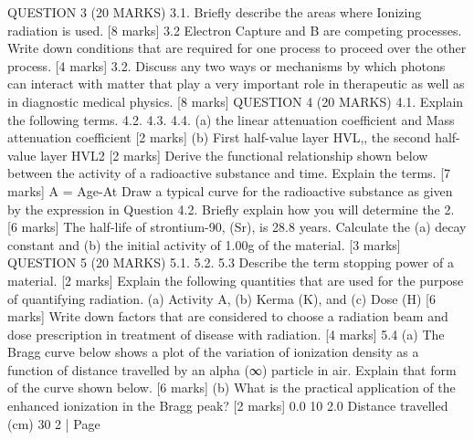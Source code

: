 \documentclass[addpoints]{exam}
\begin{document}
\begin{questions}
\begin{parts}
QUESTION 3 (20 MARKS)
3.1. Briefly describe the areas where Ionizing radiation is used. [8 marks]
3.2 Electron Capture and B are competing processes. Write down conditions that are required for one process to proceed over the other process. [4 marks]
3.2.
Discuss any two ways or mechanisms by which photons can interact with matter that play a very important role in therapeutic as well as in diagnostic medical physics. [8 marks]
QUESTION 4 (20 MARKS)
4.1. Explain the following terms.
4.2.
4.3.
4.4.
(a) the linear attenuation coefficient and Mass attenuation coefficient [2 marks] (b) First half-value layer HVL,, the second half-value layer HVL2 [2 marks]
Derive the functional relationship shown below between the activity of a radioactive substance and time. Explain the terms. [7 marks]
A = Age-At
Draw a typical curve for the radioactive substance as given by the expression in Question 4.2. Briefly explain how you will determine the 2. [6 marks]
The half-life of strontium-90, (Sr), is 28.8 years. Calculate the (a) decay constant and (b) the initial activity of 1.00g of the material. [3 marks]
QUESTION 5 (20 MARKS)
5.1.
5.2.
5.3
Describe the term stopping power of a material. [2 marks]
Explain the following quantities that are used for the purpose of quantifying radiation. (a) Activity A,
(b) Kerma (K),
and (c) Dose (H) [6 marks]
Write down factors that are considered to choose a radiation beam and dose prescription in treatment of disease with radiation. [4 marks]
5.4 (a) The Bragg curve below shows a plot of the variation of ionization density as a function of distance travelled by an alpha (∞) particle in air. Explain that form of the curve shown below. [6 marks]
(b) What is the practical application of the enhanced ionization in the Bragg peak? [2 marks]
0.0
10
2.0 Distance travelled (cm)
30
2 | Page
\end{parts}

\end{questions}
\end{document}
